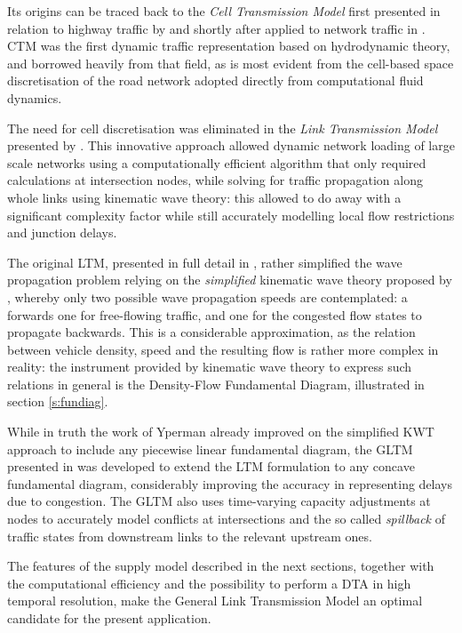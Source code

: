 Its origins can be traced back to the \emph{Cell Transmission Model} first presented in relation to highway traffic by \cite{daganzo1994cell} and shortly after applied to network traffic in \citep{daganzo1995cell}. CTM was the first dynamic traffic representation based on hydrodynamic theory, and borrowed heavily from that field, as is most evident from the cell-based space discretisation of the road network adopted directly from computational fluid dynamics.

The need for cell discretisation was eliminated in the \emph{Link Transmission Model} presented by \cite{yperman2005link}. This innovative approach allowed dynamic network loading of large scale networks using a computationally efficient algorithm that only required calculations at intersection nodes, while solving for traffic propagation along whole links using kinematic wave theory: this allowed to do away with a significant complexity factor while still accurately modelling local flow restrictions and junction delays.

The original LTM, presented in full detail in \cite{yperman2007link}, rather simplified the wave propagation problem relying on the \emph{simplified} kinematic wave theory proposed by \citep{newell1993simplified}, whereby only two possible wave propagation speeds are contemplated: a forwards one for free-flowing traffic, and one for the congested flow states to propagate backwards.
This is a considerable approximation, as the relation between vehicle density, speed and the resulting flow is rather more complex in reality:
the instrument provided by kinematic wave theory to express such relations in general is the Density-Flow Fundamental Diagram, illustrated in section \ref{s:fundiag}.

While in truth the work of Yperman already improved on the simplified KWT approach to include any piecewise linear fundamental diagram, the GLTM presented in \cite{gentile2010general} was developed to extend the LTM formulation to any concave fundamental diagram, considerably improving the accuracy in representing delays due to congestion. The GLTM also uses time-varying capacity adjustments at nodes to accurately model conflicts at intersections and the so called \emph{spillback} of traffic states from downstream links to the relevant upstream ones.

The features of the supply model described in the next sections, together with the computational efficiency and the possibility to perform a DTA in high temporal resolution, make the General Link Transmission Model an optimal candidate for the present application.


